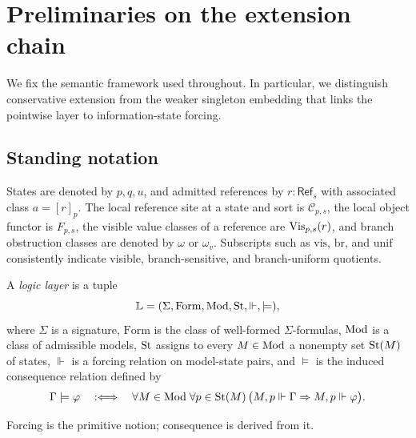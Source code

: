 \section{Preliminaries on the extension chain}\label{sec:preliminaries}

We fix the semantic framework used throughout. In particular, we distinguish conservative extension from the weaker singleton embedding that links the pointwise layer to information-state forcing.

\subsection*{Standing notation}
States are denoted by $p,q,u$, and admitted references by $r:\mathsf{Ref}_s$ with associated class $a=[r]_p$. The local reference site at a state and sort is $\mathcal C_{p,s}$, the local object functor is $F_{p,s}$, the visible value classes of a reference are $\mathrm{Vis}_{p,s}(r)$, and branch obstruction classes are denoted by $\omega$ or $\omega_v$. Subscripts such as $\mathrm{vis}$, $\mathrm{br}$, and $\mathrm{unif}$ consistently indicate visible, branch-sensitive, and branch-uniform quotients.

\begin{definition}\label{def:logic-layer}
A \emph{logic layer} is a tuple
\[
\mathbb{L}=(\Sigma,\mathrm{Form},\mathrm{Mod},\mathrm{St},\Vdash,\models),
\]
where $\Sigma$ is a signature, $\mathrm{Form}$ is the class of well-formed $\Sigma$-formulas, $\mathrm{Mod}$ is a class of admissible models, $\mathrm{St}$ assigns to every $M\in\mathrm{Mod}$ a nonempty set $\mathrm{St}(M)$ of states, $\Vdash$ is a forcing relation on model-state pairs, and $\models$ is the induced consequence relation defined by
\[
\Gamma\models\varphi
\quad:\Longleftrightarrow\quad
\forall M\in\mathrm{Mod}\;\forall p\in\mathrm{St}(M)\,
\bigl(M,p\Vdash\Gamma \Rightarrow M,p\Vdash\varphi\bigr).
\]
\end{definition}

Forcing is the primitive notion; consequence is derived from it.

